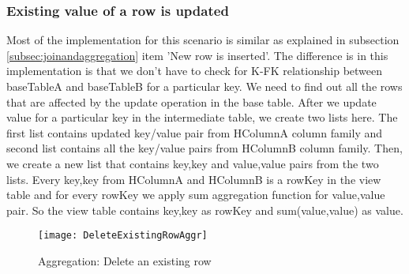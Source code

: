 \documentclass[11pt,a4paper,bibtotoc,idxtotoc,headsepline,footsepline,footexclude,BCOR12mm,DIV13]{scrbook}
\begin{document}
\subsubsection{Existing value of a row is updated}


Most of the implementation for this scenario is similar as explained in subsection \ref{subsec:joinandaggregation} item 'New row is inserted'. The difference is in this implementation is that we don't have to check for K-FK relationship between baseTableA and baseTableB for a particular key. We need to find out all the rows that are affected by the update operation in the base table. After we update value for a particular key in the intermediate table, we create two lists here. The first list contains updated key/value pair from HColumnA column family and second list contains all the key/value pairs from HColumnB column family. Then, we create a new list that contains key,key and value,value pairs from the two lists. Every key,key from HColumnA and HColumnB is a rowKey in the view table and for every rowKey we apply sum aggregation function for value,value pair. So the view table contains key,key as rowKey and sum(value,value) as value.


\begin{figure}
    \centering
    \texttt{[image: DeleteExistingRowAggr]}
    \caption{Aggregation: Delete an existing row}
    \label{sec:deleteexistingrow}
    
\end{figure} 
\end{document}
